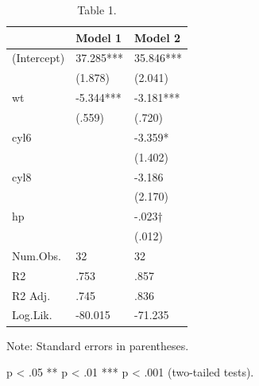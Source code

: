 \begin{table}[!t]
\centering
\caption{Table 1.}
\begin{threeparttable}
\begin{tabular}{lll}
\toprule
& Model 1 & Model 2 \\ \midrule
(Intercept) & 37.285*** & 35.846*** \\
& (1.878) & (2.041) \\
wt & -5.344*** & -3.181*** \\
& (.559) & (.720) \\
cyl6 &  & -3.359* \\
&  & (1.402) \\
cyl8 &  & -3.186 \\
&  & (2.170) \\
hp &  & -.023† \\
&  & (.012) \\
Num.Obs. & 32 & 32 \\
R2 & .753 & .857 \\
R2 Adj. & .745 & .836 \\
Log.Lik. & -80.015 & -71.235 \\
\bottomrule
\end{tabular}
\begin{tablenotes}[flushleft]\footnotesize
\item Note: Standard errors in parentheses.
\item * p < .05  ** p < .01  *** p < .001 (two-tailed tests).
\end{tablenotes}
\end{threeparttable}
\end{table}

